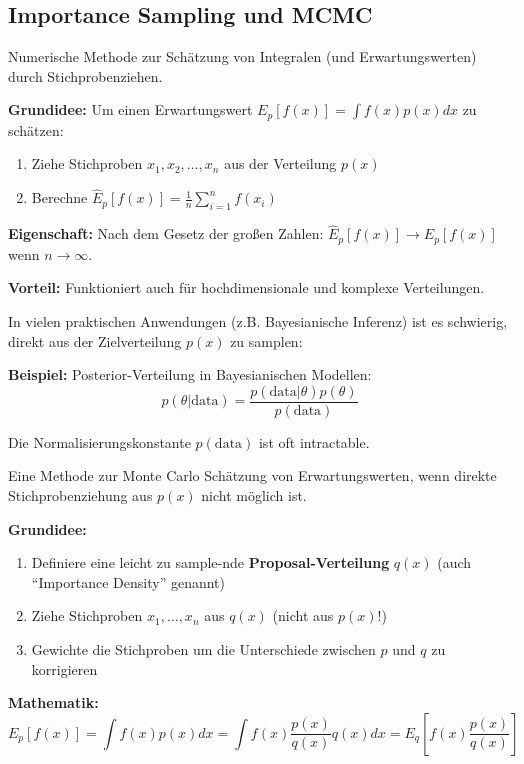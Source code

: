 \newpage

\subsection{Importance Sampling und MCMC}

Numerische Methode zur Schätzung von Integralen (und Erwartungswerten) durch Stichprobenziehen.

\textbf{Grundidee:} Um einen Erwartungswert $E_p[f(x)] = \int f(x) p(x) dx$ zu schätzen:
\begin{enumerate}[leftmargin=1.5em]
    \item Ziehe Stichproben $x_1, x_2, \ldots, x_n$ aus der Verteilung $p(x)$
    \item Berechne $\hat{E}_p[f(x)] = \frac{1}{n} \sum_{i=1}^{n} f(x_i)$
\end{enumerate}

\textbf{Eigenschaft:} Nach dem Gesetz der großen Zahlen: $\hat{E}_p[f(x)] \to E_p[f(x)]$ wenn $n \to \infty$.

\textbf{Vorteil:} Funktioniert auch für hochdimensionale und komplexe Verteilungen.

In vielen praktischen Anwendungen (z.B. Bayesianische Inferenz) ist es schwierig, direkt aus der Zielverteilung $p(x)$ zu samplen:

\textbf{Beispiel:} Posterior-Verteilung in Bayesianischen Modellen:
$$p(\theta | \text{data}) = \frac{p(\text{data} | \theta) p(\theta)}{p(\text{data})}$$

Die Normalisierungskonstante $p(\text{data})$ ist oft intractable.

Eine Methode zur Monte Carlo Schätzung von Erwartungswerten, wenn direkte Stichprobenziehung aus $p(x)$ nicht möglich ist.

\textbf{Grundidee:}
\begin{enumerate}[leftmargin=1.5em]
    \item Definiere eine leicht zu sample-nde \textbf{Proposal-Verteilung} $q(x)$ (auch ``Importance Density'' genannt)
    \item Ziehe Stichproben $x_1, \ldots, x_n$ aus $q(x)$ (nicht aus $p(x)$!)
    \item Gewichte die Stichproben um die Unterschiede zwischen $p$ und $q$ zu korrigieren
\end{enumerate}

\textbf{Mathematik:}
$$E_p[f(x)] = \int f(x) p(x) dx = \int f(x) \frac{p(x)}{q(x)} q(x) dx = E_q\left[f(x) \frac{p(x)}{q(x)}\right]$$

